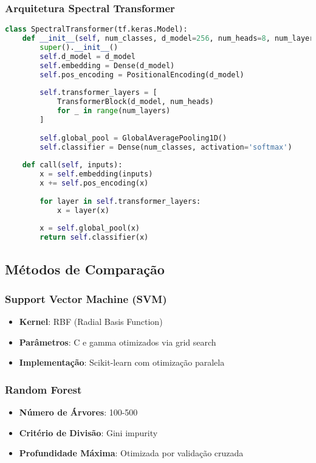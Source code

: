 \subsubsection{Arquitetura Spectral Transformer}
\begin{lstlisting}[language=Python, caption=Spectral Transformer]
class SpectralTransformer(tf.keras.Model):
    def __init__(self, num_classes, d_model=256, num_heads=8, num_layers=6):
        super().__init__()
        self.d_model = d_model
        self.embedding = Dense(d_model)
        self.pos_encoding = PositionalEncoding(d_model)
        
        self.transformer_layers = [
            TransformerBlock(d_model, num_heads) 
            for _ in range(num_layers)
        ]
        
        self.global_pool = GlobalAveragePooling1D()
        self.classifier = Dense(num_classes, activation='softmax')
        
    def call(self, inputs):
        x = self.embedding(inputs)
        x += self.pos_encoding(x)
        
        for layer in self.transformer_layers:
            x = layer(x)
            
        x = self.global_pool(x)
        return self.classifier(x)
\end{lstlisting}

\subsection{Métodos de Comparação}
\subsubsection{Support Vector Machine (SVM)}
\begin{itemize}
    \item \textbf{Kernel}: RBF (Radial Basis Function)
    \item \textbf{Parâmetros}: C e gamma otimizados via grid search
    \item \textbf{Implementação}: Scikit-learn com otimização paralela
\end{itemize}

\subsubsection{Random Forest}
\begin{itemize}
    \item \textbf{Número de Árvores}: 100-500
    \item \textbf{Critério de Divisão}: Gini impurity
    \item \textbf{Profundidade Máxima}: Otimizada por validação cruzada
\end{itemize}

